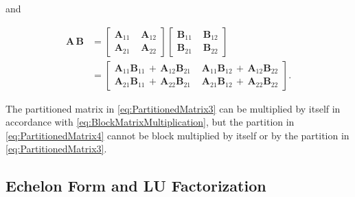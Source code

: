\documentclass[graybox,envcountchap,sectrefs]{svmono}\usepackage[]{graphicx}\usepackage[]{xcolor}
\begin{document}
\begin{appendices}
and

\begin{align}
\mathrm{\mathbf{A\,B}} & =\left[\begin{array}{c|c}
\mathrm{\mathbf{A}}_{11}\, & \,\mathrm{\mathbf{A}}_{12}\\
\hline \mathrm{\mathbf{A}}_{21}\, & \,\mathrm{\mathbf{A}}_{22}
\end{array}\right]\left[\begin{array}{c|c}
\mathrm{\mathbf{B}}_{11}\, & \,\mathrm{\mathbf{B}}_{12}\\
\hline \mathrm{\mathbf{B}}_{21}\, & \,\mathrm{\mathbf{B}}_{22}
\end{array}\right]\nonumber \\[0.5em]
 & =\left[\begin{array}{c|c}
\mathrm{\mathbf{A}}_{11}\mathrm{\mathbf{B}}_{11}\,+\,\mathrm{\mathbf{A}}_{12}\mathrm{\mathbf{B}}_{21}\, & \,\mathrm{\mathbf{A}}_{11}\mathrm{\mathbf{B}}_{12}\,+\,\mathrm{\mathbf{A}}_{12}\mathrm{\mathbf{B}}_{22}\\
\hline \mathrm{\mathbf{A}}_{21}\mathrm{\mathbf{B}}_{11}\,+\,\mathrm{\mathbf{A}}_{22}\mathrm{\mathbf{B}}_{21}\, & \,\mathrm{\mathbf{A}}_{21}\mathrm{\mathbf{B}}_{12}\,+\,\mathrm{\mathbf{A}}_{22}\mathrm{\mathbf{B}}_{22}
\end{array}\right].\label{eq:BlockMatrixMultiplication}
\end{align}

The partitioned matrix in \eqref{eq:PartitionedMatrix3} can be multiplied
by itself in accordance with \eqref{eq:BlockMatrixMultiplication},
but the partition in \eqref{eq:PartitionedMatrix4} cannot be block
multiplied by itself or by the partition in \eqref{eq:PartitionedMatrix3}.


\subsection{Echelon Form and LU Factorization}


\end{appendices}
\end{document}
